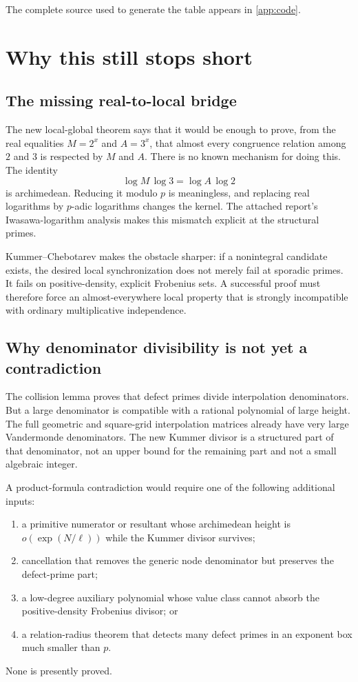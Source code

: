 \documentclass[11pt]{article}
\theoremstyle{definition}
\begin{document}
The complete source used to generate the table appears in \cref{app:code}.

\section{Why this still stops short}
\label{sec:barrier}

\subsection{The missing real-to-local bridge}

The new local-global theorem says that it would be enough to prove, from the real equalities
$M=2^x$ and $A=3^x$, that almost every congruence relation among $2$ and $3$ is respected by
$M$ and $A$.  There is no known mechanism for doing this.  The identity
\[
 \log M\,\log3=\log A\,\log2
\]
is archimedean.  Reducing it modulo $p$ is meaningless, and replacing real logarithms by
$p$-adic logarithms changes the kernel.  The attached report's Iwasawa-logarithm analysis
makes this mismatch explicit at the structural primes.

Kummer--Chebotarev makes the obstacle sharper: if a nonintegral candidate exists, the desired
local synchronization does not merely fail at sporadic primes.  It fails on positive-density,
explicit Frobenius sets.  A successful proof must therefore force an almost-everywhere local
property that is strongly incompatible with ordinary multiplicative independence.

\subsection{Why denominator divisibility is not yet a contradiction}

The collision lemma proves that defect primes divide interpolation denominators.  But a large
denominator is compatible with a rational polynomial of large height.  The full geometric and
square-grid interpolation matrices already have very large Vandermonde denominators.  The new
Kummer divisor is a structured part of that denominator, not an upper bound for the remaining
part and not a small algebraic integer.

A product-formula contradiction would require one of the following additional inputs:
\begin{enumerate}[label=(\alph*)]
\item a primitive numerator or resultant whose archimedean height is
$o(\exp(N/\ell))$ while the Kummer divisor survives;
\item cancellation that removes the generic node denominator but preserves the defect-prime
part;
\item a low-degree auxiliary polynomial whose value class cannot absorb the positive-density
Frobenius divisor; or
\item a relation-radius theorem that detects many defect primes in an exponent box much
smaller than $p$.
\end{enumerate}
None is presently proved.
\end{document}
